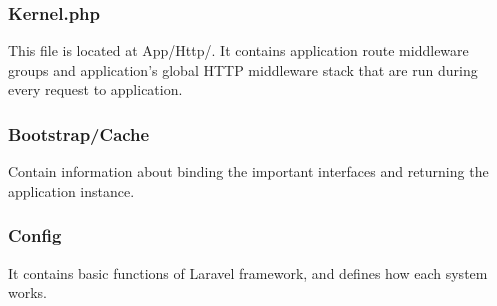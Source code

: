 \documentclass[letterpaper, 10 pt, conference]{ieeeconf}  %
\begin{document}
\subsubsection{Kernel.php}
This file is located at App/Http/. It contains application route middleware groups and application’s global HTTP middleware stack that are run during every request to application.\\


\begin{center}
\end{center}
\subsubsection{Bootstrap/Cache\\}
Contain information about binding the important interfaces and returning the application instance.\\

\begin{center}
\end{center}
\subsubsection{Config\\}
It contains basic functions of Laravel framework, and defines how each system works.\\

\end{document}
